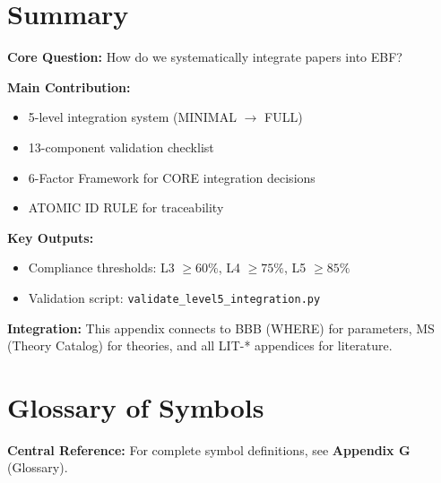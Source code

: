\section{Summary}
\label{sec:paperint-summary}

\begin{tcolorbox}[colback=green!10!white, colframe=green!75!black,
    title=\textbf{Appendix VB: Summary}]

\textbf{Core Question:} How do we systematically integrate papers into EBF?

\textbf{Main Contribution:}
\begin{itemize}[nosep]
    \item 5-level integration system (MINIMAL $\rightarrow$ FULL)
    \item 13-component validation checklist
    \item 6-Factor Framework for CORE integration decisions
    \item ATOMIC ID RULE for traceability
\end{itemize}

\textbf{Key Outputs:}
\begin{itemize}[nosep]
    \item Compliance thresholds: L3 $\geq 60\%$, L4 $\geq 75\%$, L5 $\geq 85\%$
    \item Validation script: \texttt{validate\_level5\_integration.py}
\end{itemize}

\textbf{Integration:} This appendix connects to BBB (WHERE) for parameters,
MS (Theory Catalog) for theories, and all LIT-* appendices for literature.

\end{tcolorbox}


\section{Glossary of Symbols}
\label{sec:paperint-glossary}

\begin{tcolorbox}[colback=blue!5!white, colframe=blue!75!black]
\textbf{Central Reference:} For complete symbol definitions, see
\textbf{Appendix G} (Glossary).
\end{tcolorbox}

